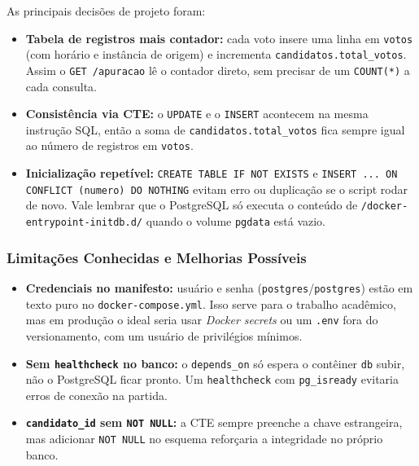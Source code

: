 \documentclass[12pt,a4paper]{article}
\begin{document}
As principais decisões de projeto foram:
\begin{itemize}
    \item \textbf{Tabela de registros mais contador:} cada voto insere uma linha em \texttt{votos} (com horário e instância de origem) e incrementa \texttt{candidatos.total\_votos}. Assim o \texttt{GET /apuracao} lê o contador direto, sem precisar de um \texttt{COUNT(*)} a cada consulta.
    \item \textbf{Consistência via CTE:} o \texttt{UPDATE} e o \texttt{INSERT} acontecem na mesma instrução SQL, então a soma de \texttt{candidatos.total\_votos} fica sempre igual ao número de registros em \texttt{votos}.
    \item \textbf{Inicialização repetível:} \texttt{CREATE TABLE IF NOT EXISTS} e \texttt{INSERT ... ON CONFLICT (numero) DO NOTHING} evitam erro ou duplicação se o script rodar de novo. Vale lembrar que o PostgreSQL só executa o conteúdo de \texttt{/docker-entrypoint-initdb.d/} quando o volume \texttt{pgdata} está vazio.
\end{itemize}

\subsubsection{Limitações Conhecidas e Melhorias Possíveis}
\begin{itemize}
    \item \textbf{Credenciais no manifesto:} usuário e senha (\texttt{postgres}/\texttt{postgres}) estão em texto puro no \texttt{docker-compose.yml}. Isso serve para o trabalho acadêmico, mas em produção o ideal seria usar \textit{Docker secrets} ou um \texttt{.env} fora do versionamento, com um usuário de privilégios mínimos.
    \item \textbf{Sem \texttt{healthcheck} no banco:} o \texttt{depends\_on} só espera o contêiner \texttt{db} subir, não o PostgreSQL ficar pronto. Um \texttt{healthcheck} com \texttt{pg\_isready} evitaria erros de conexão na partida.
    \item \textbf{\texttt{candidato\_id} sem \texttt{NOT NULL}:} a CTE sempre preenche a chave estrangeira, mas adicionar \texttt{NOT NULL} no esquema reforçaria a integridade no próprio banco.
\end{itemize}
\end{document}
